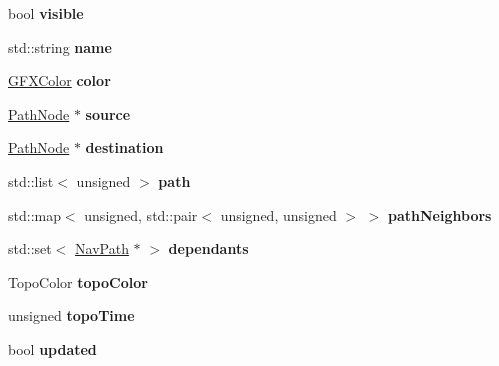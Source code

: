 \begin{DoxyCompactItemize}
\item 
bool {\bfseries visible}\hypertarget{classNavPath_aa051d31e0e7b72df438810a214b5512c}{}\label{classNavPath_aa051d31e0e7b72df438810a214b5512c}

\item 
std\+::string {\bfseries name}\hypertarget{classNavPath_a9452b05b8ca647d405224a1a89078757}{}\label{classNavPath_a9452b05b8ca647d405224a1a89078757}

\item 
\hyperlink{structGFXColor}{G\+F\+X\+Color} {\bfseries color}\hypertarget{classNavPath_abda50432888fdfaf615a9b19caa422a0}{}\label{classNavPath_abda50432888fdfaf615a9b19caa422a0}

\item 
\hyperlink{classPathNode}{Path\+Node} $\ast$ {\bfseries source}\hypertarget{classNavPath_a17002566eb65066de5558f12931c9339}{}\label{classNavPath_a17002566eb65066de5558f12931c9339}

\item 
\hyperlink{classPathNode}{Path\+Node} $\ast$ {\bfseries destination}\hypertarget{classNavPath_a8fa9086cf104ee17330f023f9ba7d153}{}\label{classNavPath_a8fa9086cf104ee17330f023f9ba7d153}

\item 
std\+::list$<$ unsigned $>$ {\bfseries path}\hypertarget{classNavPath_aeb0459c9685eb7d3a147a00b7f1fd030}{}\label{classNavPath_aeb0459c9685eb7d3a147a00b7f1fd030}

\item 
std\+::map$<$ unsigned, std\+::pair$<$ unsigned, unsigned $>$ $>$ {\bfseries path\+Neighbors}\hypertarget{classNavPath_a6382d08080cf8289774e6326d9aead91}{}\label{classNavPath_a6382d08080cf8289774e6326d9aead91}

\item 
std\+::set$<$ \hyperlink{classNavPath}{Nav\+Path} $\ast$ $>$ {\bfseries dependants}\hypertarget{classNavPath_a3f77f3fde97eea87c767e628b7d33ab2}{}\label{classNavPath_a3f77f3fde97eea87c767e628b7d33ab2}

\item 
Topo\+Color {\bfseries topo\+Color}\hypertarget{classNavPath_a05cecbc43d63fdd324cbe451796b2a32}{}\label{classNavPath_a05cecbc43d63fdd324cbe451796b2a32}

\item 
unsigned {\bfseries topo\+Time}\hypertarget{classNavPath_a4772c5bdf55c78781adb22cdfc97b323}{}\label{classNavPath_a4772c5bdf55c78781adb22cdfc97b323}

\item 
bool {\bfseries updated}\hypertarget{classNavPath_a5c0f68654c49e0b0babbbc7c943d3e86}{}\label{classNavPath_a5c0f68654c49e0b0babbbc7c943d3e86}

\end{DoxyCompactItemize}
